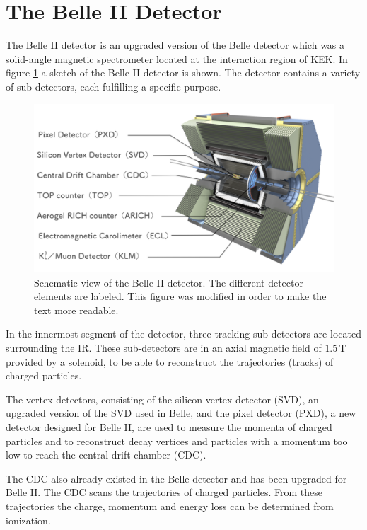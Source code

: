 \documentclass[a4paper,11pt,twosided,final,german,openbib,pdftex,listof=totoc,bibliography=totoc]{scrbook}
\begin{document}
\section{The Belle II Detector}
\label{sec:Belle II}

The Belle II detector is an upgraded version of the Belle detector which was a solid-angle magnetic spectrometer located at the interaction region of KEK. In figure \ref{fig:Belle2} a sketch of the Belle II detector is shown. The detector contains a variety of sub-detectors, each fulfilling a specific purpose.
 
\begin{figure}[h!]
	\centering
	\includegraphics[width=\textwidth]{Bilder/Belle2.pdf}
	
	\caption[Belle II Detector]{Schematic view of the Belle II detector. The different detector elements are labeled. \cite{BDetector} This figure was modified in order to make the text more readable.}
	\label{fig:Belle2}
\end{figure}

 In the innermost segment of the detector, three tracking sub-detectors are located surrounding the IR. These sub-detectors are in an axial magnetic field of $1.5\,\textrm{T}$ provided by a solenoid, to be able to reconstruct the trajectories (tracks) of charged particles. 
 
 The vertex detectors, consisting of the silicon vertex detector (SVD), an upgraded version of the SVD used in Belle, and the pixel detector (PXD), a new detector designed for Belle II, are used to measure the momenta of charged particles and to reconstruct decay vertices and particles with a momentum too low to reach the central drift chamber (CDC).

The CDC also already existed in the Belle detector and has been upgraded for Belle II. The CDC scans the trajectories of charged particles. From these trajectories the charge, momentum and energy loss can be determined from ionization. 
\end{document}
